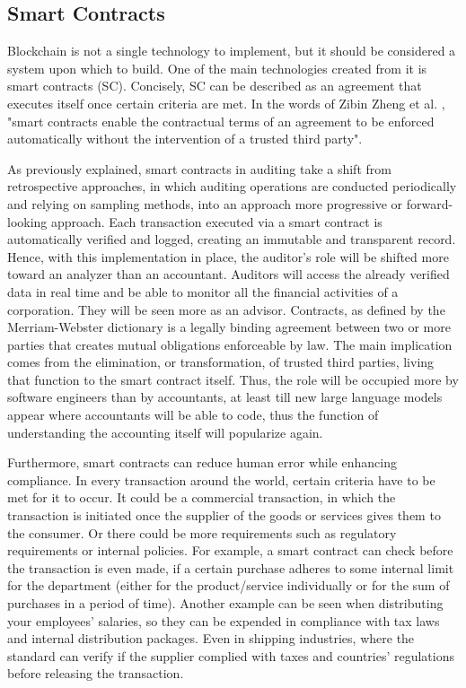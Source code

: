 \subsection{Smart Contracts}
\label{sub: smart contracts}

Blockchain is not a single technology to implement, but it should be considered a system upon which to build. One of the main technologies created from it is smart contracts (SC). Concisely, SC can be described as an agreement that executes itself once certain criteria are met. In the words of Zibin Zheng et al. \cite{smartContractsDefinition}, "smart contracts enable the contractual terms of an agreement to be enforced automatically without the intervention of a trusted third party". 

As previously explained, smart contracts in auditing take a shift from retrospective approaches, in which auditing operations are conducted periodically and relying on sampling methods, into an approach more progressive or forward-looking approach. Each transaction executed via a smart contract is automatically verified and logged, creating an immutable and transparent record.
Hence, with this implementation in place, the auditor's role will be shifted more toward an analyzer than an accountant. Auditors will access the already verified data in real time and be able to monitor all the financial activities of a corporation. They will be seen more as an advisor. Contracts, as defined by the Merriam-Webster \cite{definitionContract} dictionary is a legally binding agreement between two or more parties that creates mutual obligations enforceable by law. The main implication comes from the elimination, or transformation, of trusted third parties, living that function to the smart contract itself. Thus, the role will be occupied more by software engineers than by accountants, at least till new large language models appear where accountants will be able to code, thus the function of understanding the accounting itself will popularize again. 

Furthermore, smart contracts can reduce human error while enhancing compliance. In every transaction around the world, certain criteria have to be met for it to occur. It could be a commercial transaction, in which the transaction is initiated once the supplier of the goods or services gives them to the consumer. Or there could be more requirements such as regulatory requirements or internal policies. For example, a smart contract can check before the transaction is even made, if a certain purchase adheres to some internal limit for the department (either for the product/service individually or for the sum of purchases in a period of time). Another example can be seen when distributing your employees' salaries, so they can be expended in compliance with tax laws and internal distribution packages. Even in shipping industries, where the standard can verify if the supplier complied with taxes and countries' regulations before releasing the transaction. 

